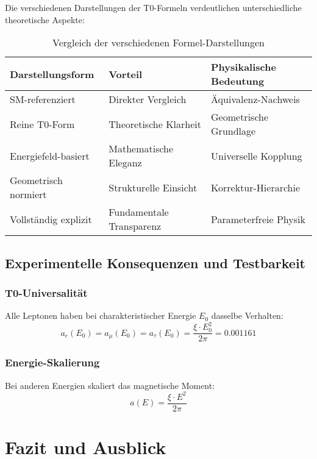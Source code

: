 \documentclass[12pt,a4paper]{article}
\numberwithin{equation}{section}
\newcommand{\xipar}{\xi}
\begin{document}
	Die verschiedenen Darstellungen der T0-Formeln verdeutlichen unterschiedliche theoretische Aspekte:
	
	\begin{table}[H]
		\centering
		\begin{tabular}{lll}
			\toprule
			\textbf{Darstellungsform} & \textbf{Vorteil} & \textbf{Physikalische Bedeutung} \\
			\midrule
			SM-referenziert & Direkter Vergleich & Äquivalenz-Nachweis \\
			Reine T0-Form & Theoretische Klarheit & Geometrische Grundlage \\
			Energiefeld-basiert & Mathematische Eleganz & Universelle Kopplung \\
			Geometrisch normiert & Strukturelle Einsicht & Korrektur-Hierarchie \\
			Vollständig explizit & Fundamentale Transparenz & Parameterfreie Physik \\
			\bottomrule
		\end{tabular}
		\caption{Vergleich der verschiedenen Formel-Darstellungen}
		\label{tab:formula_comparison}
	\end{table}
	
	\subsection{Experimentelle Konsequenzen und Testbarkeit}
	
	\subsubsection{T0-Universalität}
	
	Alle Leptonen haben bei charakteristischer Energie $E_0$ dasselbe Verhalten:
	\begin{equation}
		a_e(E_0) = a_\mu(E_0) = a_\tau(E_0) = \frac{\xipar \cdot E_0^2}{2\pi} = 0.001161
	\end{equation}
	
	\subsubsection{Energie-Skalierung}
	
	Bei anderen Energien skaliert das magnetische Moment:
	\begin{equation}
		a(E) = \frac{\xipar \cdot E^2}{2\pi}
	\end{equation}
	
	\section{Fazit und Ausblick}
	
\end{document}

